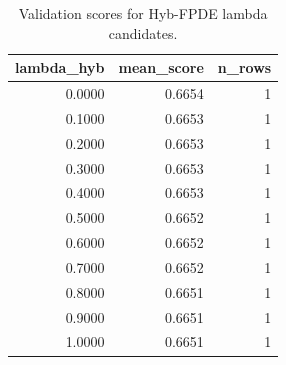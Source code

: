 \begin{table}[t]
\caption{Validation scores for Hyb-FPDE lambda candidates.}
\label{tab:lambda_distribution_computed}
\centering
\begin{tabular}{rrr}
\toprule
lambda\_hyb & mean\_score & n\_rows \\
\midrule
0.0000 & 0.6654 & 1 \\
0.1000 & 0.6653 & 1 \\
0.2000 & 0.6653 & 1 \\
0.3000 & 0.6653 & 1 \\
0.4000 & 0.6653 & 1 \\
0.5000 & 0.6652 & 1 \\
0.6000 & 0.6652 & 1 \\
0.7000 & 0.6652 & 1 \\
0.8000 & 0.6651 & 1 \\
0.9000 & 0.6651 & 1 \\
1.0000 & 0.6651 & 1 \\
\bottomrule
\end{tabular}

\end{table}
